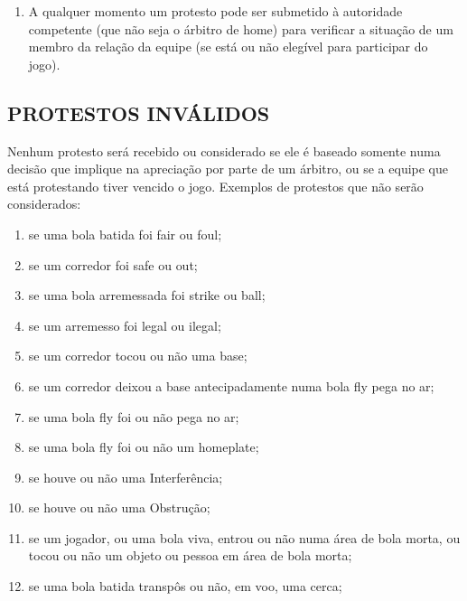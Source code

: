 \begin{multicols}{2}
\begin{enumerate}[label=\alph*)]
	\item  A qualquer momento um protesto pode ser submetido \`a autoridade competente (que n\~ao seja o \'arbitro de \gls{home}) para verificar a situa\c{c}\~ao de um membro da rela\c{c}\~ao da equipe (se est\'a ou n\~ao eleg\'ivel para participar do jogo). 
\end{enumerate}


\subsection{PROTESTOS INV\'ALIDOS}
Nenhum protesto ser\'a recebido ou considerado se ele \'e baseado somente numa decis\~ao que implique na aprecia\c{c}\~ao por parte de um \'arbitro, ou se a equipe que est\'a protestando tiver vencido o jogo. Exemplos de protestos que n\~ao ser\~ao considerados: 

\begin{enumerate}[label=\alph*)]
	\item se uma bola batida foi \gls{fair} ou \gls{foul}; 

	\item  se um corredor foi \gls{safe} ou \gls{out}; 

	\item  se uma bola arremessada foi \gls{strike} ou \gls{ball};

	\item se um arremesso foi legal ou ilegal; 

	\item  se um corredor tocou ou n\~ao uma base; 

	\item  se um corredor deixou a base antecipadamente numa bola \gls{fly} pega no ar; 

	\item  se uma bola \gls{fly} foi ou n\~ao pega no ar; 

	\item  se uma bola \gls{fly} foi ou n\~ao um \gls{homeplate}; 

	\item  se houve ou n\~ao uma Interfer\^encia; 

	\item  se houve ou n\~ao uma Obstru\c{c}\~ao; 

	\item  se um jogador, ou uma bola viva, entrou ou n\~ao numa \'area de bola morta, ou tocou 
ou n\~ao um objeto ou pessoa em \'area de bola morta; 

	\item  se uma bola batida transpôs ou n\~ao, em voo, uma cerca; 


\end{enumerate}
\end{multicols}
